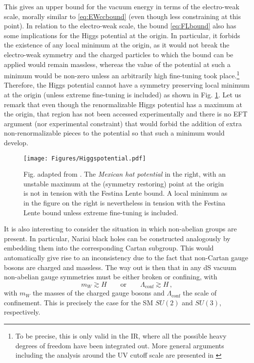 \documentclass[11pt,a4paper]{article}
\begin{document}
This gives an upper bound for the vacuum energy in terms of the electro-weak scale, morally similar to \eqref{eq:EWccbound} (even though less constraining at this point). In relation to the electro-weak scale, the bound \eqref{eq:FLbound} also has some implications for the Higgs potential at the origin. In particular, it forbids the existence of any local minimum at the origin, as it would not break the electro-weak symmetry and the charged particles to which the bound can be applied would remain massless, whereas the value of the potential at such a minimum would be non-zero unless an arbitrarily high fine-tuning took place.\footnote{To be precise, this is only valid in the IR, where all the possible heavy degrees of freedom have been integrated out. More general arguments including the analysis around the UV cutoff scale are presented in \cite{Montero:2021otb}} Therefore, the Higgs potential cannot have a symmetry preserving local minimum at the origin (unless extreme fine-tuning is included) as shown in Fig. \ref{fig:Higgspotential}. Let us remark that even though the renormalizable Higgs potential has a maximum at the origin, that region has not been accessed experimentally and there is no EFT argument (nor experimental constraint) that would forbid the addition of extra non-renormalizable pieces to the potential so that such a minimum would develop.

\begin{figure}[t]
	\begin{center}
			\texttt{[image: Figures/Higgspotential.pdf]} 
	\caption{\protect \footnotesize Fig. adapted from \cite{Montero:2021otb}. The \emph{Mexican hat potential} in the right, with an unstable maximum at the (symmetry restoring) point at the origin is not in tension with the Festina Lente bound. A local minimum as in the figure on the right is nevertheless in tension with the Festina Lente bound unless extreme fine-tuning is included. }
		\label{fig:Higgspotential}
	\end{center}
\end{figure}  

It is also interesting to consider the situation in which non-abelian groups are present. In particular, Nariai black holes can be constructed analogously by embedding them into the corresponding Cartan subgroup. This would automatically give rise to an inconsistency due to the fact that non-Cartan gauge bosons are charged and massless. The way out is then that in any dS vacuum non-abelian gauge symmetries must be either broken or confining, with
\begin{equation}
m_{W}\gtrsim H \qquad \text{or} 	\qquad  \Lambda_{\mathrm{conf}} \gtrsim H \, , 
\end{equation}
with $m_W$ the masses of the  charged gauge bosons and $\Lambda_{\mathrm{conf}}$ the scale of confinement. This is precisely the case for the SM $SU(2)$ and $SU(3)$, respectively.
\end{document}
